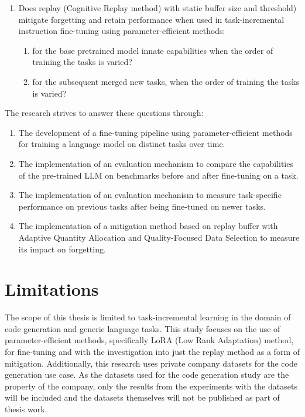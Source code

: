 \begin{enumerate}[label={RQ\arabic*.}, leftmargin=*]
\item Does replay (Cognitive Replay method) \cite{zhang2024core} with static buffer size and threshold) mitigate forgetting and retain performance when used in task-incremental instruction fine-tuning using parameter-efficient methods:
    \begin{enumerate}[label={RQ5\alph*.}, leftmargin=*]
        \item for the base pretrained model innate capabilities when the order of training the tasks is varied?
        \item for the subsequent merged new tasks, when the order of training the tasks is varied?
    \end{enumerate}

\end{enumerate}

The research strives to answer these questions through:
\begin{enumerate}
    \item The development of a fine-tuning pipeline using parameter-efficient methods for training a language model on distinct tasks over time.
    \item The implementation of an evaluation mechanism to compare the capabilities of the pre-trained LLM on benchmarks before and after fine-tuning on a task.
    \item The implementation of an evaluation mechanism to measure task-specific performance on previous tasks after being fine-tuned on newer tasks.
    \item The implementation of a mitigation method based on replay buffer with Adaptive Quantity Allocation and Quality-Focused Data Selection to measure its impact on forgetting.
\end{enumerate}

\section{Limitations}
The scope of this thesis is limited to task-incremental learning in the domain of code generation and generic language tasks. This study focuses on the use of parameter-efficient methods, specifically LoRA (Low Rank Adaptation) method, for fine-tuning and with the investigation into just the replay method as a form of mitigation. Additionally, this research uses private company datasets for the code generation use case. As the datasets used for the code generation study are the property of the company, only the results from the experiments with the datasets will be included and the datasets themselves will not be published as part of thesis work.

